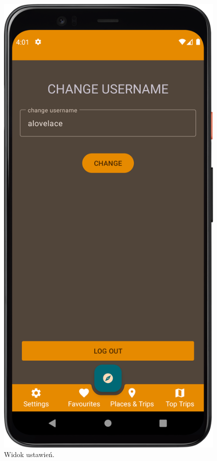         \vspace{1cm}
        \begin{figure}[H]
            \centering
            \includegraphics[scale=0.10]{src/app/settings.png}
            \caption{Widok ustawień.\label{settings}}
            \qquad
        \end{figure} 
        \vspace{1cm}

